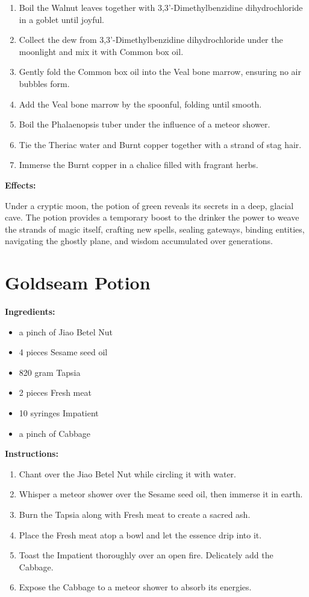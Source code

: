 \documentclass{article}
\begin{document}
\begin{enumerate}
  \item Boil the Walnut leaves together with 3,3'-Dimethylbenzidine dihydrochloride in a goblet until joyful.
  \item Collect the dew from 3,3'-Dimethylbenzidine dihydrochloride under the moonlight and mix it with Common box oil.
  \item Gently fold the Common box oil into the Veal  bone marrow, ensuring no air bubbles form.
  \item Add the Veal  bone marrow by the spoonful, folding until smooth.
  \item Boil the Phalaenopsis tuber under the influence of a meteor shower.
  \item Tie the Theriac water and Burnt copper together with a strand of stag hair.
  \item Immerse the Burnt copper in a chalice filled with fragrant herbs.
\end{enumerate}

\textbf{Effects:}

Under a cryptic moon, the potion of green reveals its secrets in a deep, glacial cave. The potion provides a temporary boost to the drinker the power to weave the strands of magic itself, crafting new spells, sealing gateways, binding entities, navigating the ghostly plane, and wisdom accumulated over generations.

\newpage
\section*{Goldseam Potion}

\textbf{Ingredients:}

\begin{itemize}
  \item a pinch of Jiao Betel Nut
  \item 4 pieces Sesame seed oil
  \item 820 gram Tapsia
  \item 2 pieces Fresh meat
  \item 10 syringes Impatient
  \item a pinch of Cabbage
\end{itemize}

\textbf{Instructions:}

\begin{enumerate}
  \item Chant over the Jiao Betel Nut while circling it with water.
  \item Whisper a meteor shower over the Sesame seed oil, then immerse it in earth.
  \item Burn the Tapsia along with Fresh meat to create a sacred ash.
  \item Place the Fresh meat atop a bowl and let the essence drip into it.
  \item Toast the Impatient thoroughly over an open fire. Delicately add the Cabbage.
  \item Expose the Cabbage to a meteor shower to absorb its energies.
\end{enumerate}
\end{document}
